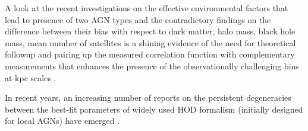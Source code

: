 \documentclass[useAMS,usenatbib]{mn2e}
\begin{document}
A look at the recent investigations on the effective environmental factors that 
lead to presence of two AGN types and the contradictory findings on the 
difference between their bias with respect to dark matter, halo mass, black hole 
mass, mean number of satellites \citep[see, e.g.,][]{Dip14CMB,Dip17a,kr18} is a 
shining evidence of the need for theoretical followup and pairing up the 
measured correlation function with complementary measurements that enhances the 
presence of the observationally challenging bins at kpc scales \citep[see, ][for 
a proposed alternative]{sta11}.

In recent years, an increasing number of reports on the persistent degeneracies 
between the best-fit parameters of widely used HOD formalism (initially 
designed for local AGNs) have emerged \citep{Coi16,coi17}. 
\end{document}
